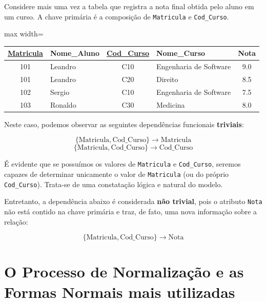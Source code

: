 \begin{tcolorbox}[breakable, colback=blue!5,colframe=blue!40!black,title=Situação exemplo]
    Considere mais uma vez a tabela que registra a nota final obtida pelo aluno em um curso. A chave primária é a composição de \texttt{Matricula} e \texttt{Cod\_Curso}.

    \vspace{0.4cm}
    \renewcommand{\arraystretch}{1.2}

    \begin{adjustbox}{max width=\textwidth}
    \begin{tabular}{|c|l|c|l|c|}
    \hline
    \textbf{\underline{Matricula}} & \textbf{Nome\_Aluno} & \textbf{\underline{Cod\_Curso}} & \textbf{Nome\_Curso} & \textbf{Nota} \\ \hline
    101 & Leandro & C10 & Engenharia de Software & 9.0 \\ \hline
    101 & Leandro & C20 & Direito & 8.5 \\ \hline
    102 & Sergio & C10 & Engenharia de Software & 7.5 \\ \hline
    103 & Ronaldo & C30 & Medicina & 8.0 \\ \hline
    \end{tabular}
\end{adjustbox}
    \vspace{0.4cm}

    Neste caso, podemos observar as seguintes dependências funcionais \textbf{triviais}:

    \[
    \{\text{Matricula}, \text{Cod\_Curso}\} \rightarrow \text{Matricula}
    \]
    \[
    \{\text{Matricula}, \text{Cod\_Curso}\} \rightarrow \text{Cod\_Curso}
    \]

    É evidente que se possuímos os valores de \texttt{Matricula} e \texttt{Cod\_Curso}, seremos capazes de determinar unicamente o valor de \texttt{Matricula} (ou do próprio \texttt{Cod\_Curso}). Trata-se de uma constatação lógica e natural do modelo.

    Entretanto, a dependência abaixo é considerada \textbf{não trivial}, pois o atributo \texttt{Nota} não está contido na chave primária e traz, de fato, uma nova informação sobre a relação:

    \[
    \{\text{Matricula}, \text{Cod\_Curso}\} \rightarrow \text{Nota}
    \]
\end{tcolorbox}

\section{O Processo de Normalização e as Formas Normais mais utilizadas}

